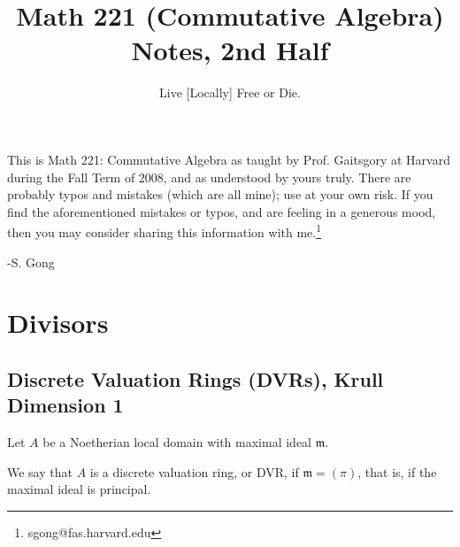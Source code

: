 \documentclass[12 pt]{article}
\theoremstyle{definition}
\begin{document}
\title{Math 221 (Commutative Algebra) Notes, 2nd Half}
\author{Live [Locally] Free or Die.}
\setcounter{tocdepth}{2}
\date{}





\begin{titlepage}


\maketitle

\vspace{2 cm}

This is Math 221: Commutative Algebra as taught by Prof. Gaitsgory at Harvard during the Fall Term of 2008, and as understood by yours truly. There are probably typos and mistakes (which are all mine); use at your own risk. If you find the aforementioned mistakes or typos, and are feeling in a generous mood, then you may consider sharing this information with me.\footnote{sgong@fas.harvard.edu}

\text{                     } -S. Gong


\end{titlepage}

\tableofcontents




\newpage

\section{Divisors}


\subsection{Discrete Valuation Rings (DVRs), Krull Dimension 1}


Let $A$ be a Noetherian local domain with maximal ideal $\mathfrak{m}$.

\begin{definition} We say that $A$ is a discrete valuation ring, or DVR, if $\mathfrak{m}=(\pi)$, that is, if the maximal ideal is principal.
\end{definition}
\end{document}
